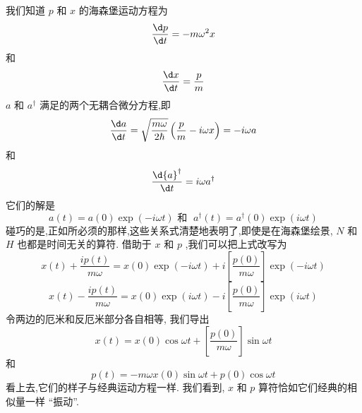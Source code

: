\documentclass[lang=cn,newtx,10pt,scheme=chinese,thmcnt=section]{elegantbook}
\begin{document}
我们知道 $p$ 和 $x$ 的海森堡运动方程为
\begin{equation}
	\frac{\d p}{\d t} = - m{\omega }^{2}x
\end{equation}
和
\begin{equation}
	\frac{\d x}{\d t} = \frac{p}{m}
\end{equation}
 $a$ 和 ${a}^{ \dagger }$ 满足的两个无耦合微分方程,即
\begin{equation}
	\frac{\d a}{\d t} = \sqrt{\frac{m\omega }{2\hbar }}\left( {\frac{p}{m} - {i\omega x}}\right) = - {i\omega a}
\end{equation}
和
\begin{equation}
	\frac{\d{a}^{ \dagger }}{\d t} = {i\omega }{a}^{ \dagger }
\end{equation}
它们的解是
\begin{equation}
	a\left( t\right) = a\left( 0\right) \exp \left( {-{i\omega t}}\right) \text{ 和 }\;{a}^{ \dagger }\left( t\right) = {a}^{ \dagger }\left( 0\right) \exp \left( {i\omega t}\right)
\end{equation}
碰巧的是,正如所必须的那样,这些关系式清楚地表明了,即使是在海森堡绘景, $N$ 和 $H$ 也都是时间无关的算符. 借助于 $x$ 和 $p$ ,我们可以把上式改写为
\begin{equation}
	x\left( t\right) + \frac{{ip}\left( t\right) }{m\omega } = x\left( 0\right) \exp \left( {-{i\omega t}}\right) + i\left\lbrack \frac{p\left( 0\right) }{m\omega }\right\rbrack \exp \left( {-{i\omega t}}\right)
\end{equation}
\begin{equation}
	x\left( t\right) - \frac{{ip}\left( t\right) }{m\omega } = x\left( 0\right) \exp \left( {i\omega t}\right) - i\left\lbrack \frac{p\left( 0\right) }{m\omega }\right\rbrack \exp \left( {i\omega t}\right)
\end{equation}
令两边的厄米和反厄米部分各自相等, 我们导出
\begin{equation}
	x\left( t\right) = x\left( 0\right) \cos {\omega t} + \left\lbrack \frac{p\left( 0\right) }{m\omega }\right\rbrack \sin {\omega t}
\end{equation}
和
\begin{equation}
	p\left( t\right) = - {m\omega x}\left( 0\right) \sin {\omega t} + p\left( 0\right) \cos {\omega t}
\end{equation}
看上去,它们的样子与经典运动方程一样. 我们看到, $x$ 和 $p$ 算符恰如它们经典的相似量一样 “振动”.
\end{document}
